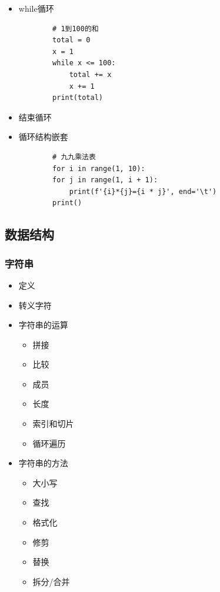 \documentclass[10pt]{elegantnote}
\begin{document}
\begin{sloppypar}
\begin{itemize}
      \begin{lstlisting}
        # 1到100的和
        total = 0
        for x in range(1, 101):
            total += x
        print(total)
      \end{lstlisting}
      \item while循环
      
      \begin{lstlisting}
        # 1到100的和
        total = 0
        x = 1
        while x <= 100:
            total += x
            x += 1
        print(total)
      \end{lstlisting}
      \item 结束循环
      \item 循环结构嵌套
      
      \begin{lstlisting}
        # 九九乘法表
        for i in range(1, 10):
        for j in range(1, i + 1):
            print(f'{i}*{j}={i * j}', end='\t')
        print()
      \end{lstlisting}
    \end{itemize}

\subsection{数据结构}


\subsubsection{字符串}
    \begin{itemize}
      \item 定义
      \item 转义字符
      \item 字符串的运算
        \begin{itemize}
          \item 拼接
          \item 比较
          \item 成员
          \item 长度
          \item 索引和切片
          \item 循环遍历
        \end{itemize}
      \item 字符串的方法
        \begin{itemize}
          \item 大小写
          \item 查找
          \item 格式化
          \item 修剪
          \item 替换
          \item 拆分/合并
        \end{itemize}
    \end{itemize}

\end{sloppypar}
\end{document}
